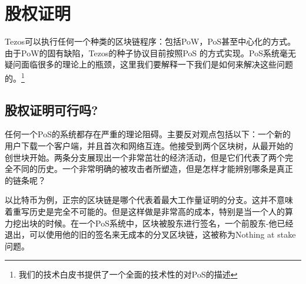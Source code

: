 \documentclass[letterpaper]{article}
\begin{document}
\section{股权证明}
Tezos可以执行任何一个种类的区块链程序：包括PoW，PoS甚至中心化的方式。
由于PoW的固有缺陷，Tezos的种子协议目前按照PoS 的方式实现。PoS系统毫无
疑问面临很多的理论上的瓶颈，这里我们要解释一下我们是如何来解决这些问题
的。\footnote{我们的技术白皮书提供了一个全面的技术性的对PoS的描述}

\subsection{股权证明可行吗?}

任何一个PoS的系统都存在严重的理论阻碍。主要反对观点包括以下：一个新的
用户下载一个客户端，并且首次和网络互连。他接受到两个区块树，从最开始的
创世块开始。两条分支展现出一个非常茁壮的经济活动，但是它们代表了两个完
全不同的历史。一个非常明确的被攻击者所塑造，但是怎样才能辨别哪条是真正
的链条呢？

以比特币为例，正宗的区块链是哪个代表着最大工作量证明的分支。这并不意味
着重写历史是完全不可能的。但是这样做是非常高的成本，特别是当一个人的算
力挖出块的时候。在一个PoS系统中，区块被股东进行签名，一个前股东-他已经
退出，可以使用他的旧的签名来无成本的分叉区块链，这被称为Nothing at
stake问题。
\end{document}
